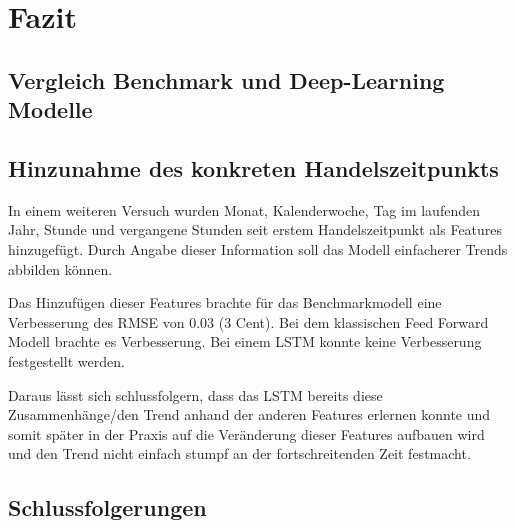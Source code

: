 \section{Fazit}

\subsection{Vergleich Benchmark und Deep-Learning Modelle}

\subsection{Hinzunahme des konkreten Handelszeitpunkts}
In einem weiteren Versuch wurden Monat, Kalenderwoche, Tag im laufenden Jahr, Stunde und vergangene Stunden seit erstem Handelszeitpunkt als Features hinzugefügt.
Durch Angabe dieser Information soll das Modell einfacherer Trends abbilden können.

Das Hinzufügen dieser Features brachte für das Benchmarkmodell eine Verbesserung des RMSE von 0.03 (3 Cent). 
Bei dem klassischen Feed Forward Modell brachte es  Verbesserung. Bei einem LSTM konnte keine Verbesserung festgestellt werden.

Daraus lässt sich schlussfolgern, dass das LSTM bereits diese Zusammenhänge/den Trend anhand der anderen Features erlernen konnte und somit später in der Praxis auf die Veränderung dieser Features aufbauen wird und den Trend nicht einfach stumpf an der fortschreitenden Zeit festmacht.

\subsection{Schlussfolgerungen}
